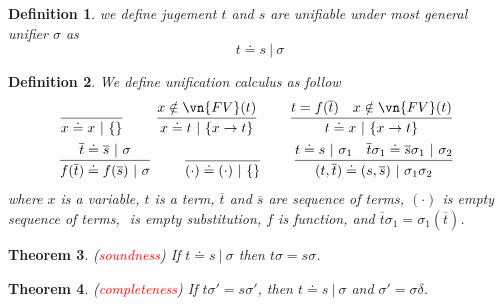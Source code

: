 \documentclass{article}
\theoremstyle{plain}
\newtheorem{theorem}{Theorem}
\newtheorem{definition}[theorem]{Definition}
\theoremstyle{nonumberplain}
\newcommand{\redt}[1]{\textcolor{red}{#1}}
\begin{document}

\begin{definition}
\rm we define jugement $t$ and $s$ are unifiable under most general unifier $\sigma$ as
\[
	t \doteq s ~|~ \sigma
\]
\end{definition}

\begin{definition}
\rm We define unification calculus as follow
\[
	\begin{gathered}
	\infer[]{x \doteq x~|~\{\}}{} \quad\quad \infer[]{x \doteq t~|~\{x \to t\}}{x \notin \vn{FV}(t)} \quad\quad \infer[]{t \doteq x~|~\{x \to t\}}{t = f(\overline{t}) & x \notin \vn{FV}(t)} \\
	\infer[]{f(\overline{t}) \doteq f(\overline{s}) ~|~ \sigma}{\overline{t} \doteq \overline{s}~|~\sigma} \quad\quad \infer[]{(\cdot) \doteq (\cdot)~|~\{\}}{} \quad\quad \infer[]{(t,\overline{t}) \doteq (s,\overline{s})~|~\sigma_1\sigma_2}{t \doteq s ~|~\sigma_1 & \overline{t}\sigma_1 \doteq \overline{s}\sigma_1~ | ~\sigma_2}
	\end{gathered}
\]
where $x$ is a variable, $t$ is a term, $\overline{t}$ and $\overline{s}$ are sequence of terms, $(\cdot)$ is empty sequence of terms, ${}$ is empty substitution, $f$ is function, and $\overline{t}\sigma_1 = \sigma_1(\overline{t})$. 
\end{definition}

\begin{theorem}
\rm (\redt{soundness}) If $t \doteq s ~|~ \sigma$ then $t\sigma = s\sigma$.
\end{theorem}

\begin{theorem}
\rm (\redt{completeness}) If $t\sigma' = s\sigma'$, then $t \doteq s ~|~\sigma$ and $\sigma' = \sigma\delta$.
\end{theorem}
\end{document}
